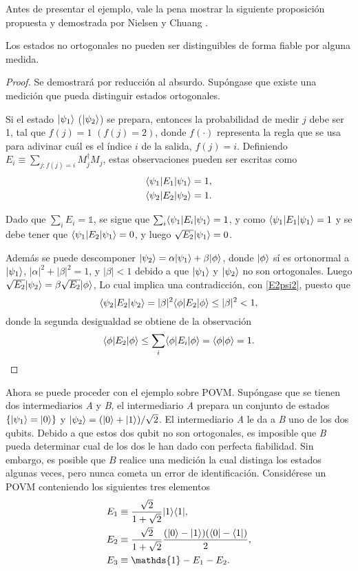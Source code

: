Antes de presentar el ejemplo, vale la pena mostrar la siguiente proposición
propuesta y demostrada por Nielsen y Chuang {\cite{nielsen_chuang_2010}}.

\begin{proposition}
Los estados no ortogonales no pueden ser distinguibles de forma fiable por alguna medida.
\end{proposition}
\begin{proof}
Se demostrará por reducción al absurdo. Supóngase que existe una medición que
pueda distinguir estados ortogonales.

Si el estado $|\psi_1\rangle $ ($|\psi_2\rangle $) se prepara, entonces la
probabilidad de medir $j$ debe ser 1, tal que  $f(j) =1$ $(f(j)=2)$, donde $f(\cdot)$ representa
la regla que se usa para adivinar cuál es el índice $i$ de la salida, $f(j)=i$. 
Definiendo $E_i\equiv \sum_{j:f(j)=i}M_j^\dagger M_j$, estas observaciones pueden ser escritas como 
\begin{align}
	\langle \psi_1|E_1|\psi_1\rangle=1, \label{E1psi1} \\
	\langle \psi_2|E_2|\psi_2\rangle=1\label{E2psi2}.
\end{align}

Dado que $\sum_i E_i=\mathds{1}$, se sigue que $\sum_i \langle \psi_1|E_i|\psi_1\rangle=1$,
y como $\langle \psi_1|E_1|\psi_1\rangle=1$ y se debe tener que $\langle \psi_1|E_2|\psi_1\rangle=0$,
y luego $\sqrt{E_2}|\psi_1\rangle=0$. 


Además se puede descomponer  
$|\psi_2\rangle=\alpha|\psi_1\rangle +\beta|\phi\rangle$, donde $|\phi\rangle$ sí es ortonormal
a $|\psi_1\rangle $, $|\alpha|^2+|\beta|^2=1$, y $|\beta|<1$ debido a que $|\psi_1\rangle$
y $|\psi_2\rangle$ no son ortogonales. Luego $\sqrt{E_2}|\psi_2\rangle=\beta \sqrt{E_2}|\phi\rangle$, Lo
cual implica una contradicción, con {\ref{E2psi2}}, puesto que \begin{equation}
	\langle \psi_2|E_2|\psi_2\rangle=|\beta|^2 \langle\phi|E_2|\phi\rangle \le |\beta|^2<1,
\end{equation} 
donde la segunda desigualdad  se obtiene de la observación \[ \langle
\phi|E_2|\phi\rangle \le \sum_i\langle \phi|E_i|\phi\rangle= \langle\phi|\phi\rangle=1. \]
\end{proof}
Ahora se puede proceder con el ejemplo sobre POVM\@. Supóngase que se tienen
dos intermediarios \textit{A} y \textit{B}, el intermediario \textit{A} prepara
un conjunto de estados $\{|\psi_1\rangle=|0\rangle\}$ y $|\psi_2\rangle=(|0\rangle
+|1\rangle)/\sqrt{2}$. El intermediario \textit{A} le da a \textit{B} uno de los
dos qubits. Debido a que estos dos qubit no son ortogonales, es imposible que
\textit{B} pueda determinar cual de los dos le han dado con perfecta
fiabilidad. Sin embargo, es posible que $B$ realice una medición la cual
distinga los estados algunas veces, pero nunca cometa un error de
identificación. Considérese un POVM conteniendo los siguientes tres elementos 
	\begin{align}
		E_1 & \equiv \dfrac{\sqrt{2}}{1+\sqrt{2}} |1\rala1|, \label{eq11} \\
		E_2 & \equiv \dfrac{\sqrt{2}}{1+\sqrt{2}} \dfrac{(|0\ra -|1\ra)(\la0|-\la1|)}{2}, \label{eq12} \\
		E_3 & \equiv \mathds{1}-E_1-E_2\label{eq13}. 
	\end{align}

